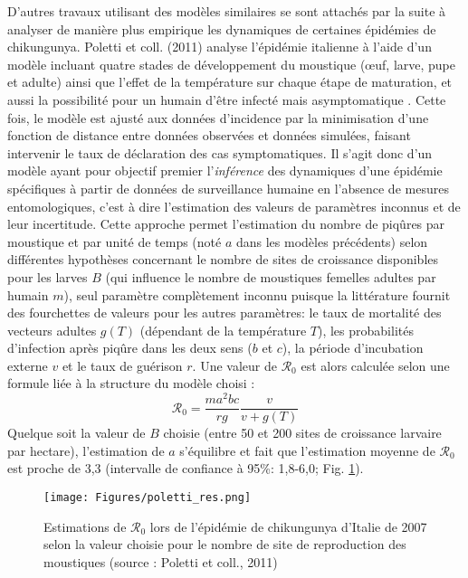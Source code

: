 D'autres travaux utilisant des modèles similaires se sont attachés par la suite à analyser de manière plus empirique les dynamiques de certaines épidémies de chikungunya.
Poletti et coll. (2011) analyse l'épidémie italienne à l'aide d'un modèle incluant quatre stades de développement du moustique (\oe uf, larve, pupe et adulte) ainsi que l'effet de la température sur chaque étape de maturation, et aussi la possibilité pour un humain d'être infecté mais asymptomatique \cite{poletti2011transmission}.
Cette fois, le modèle est ajusté aux données d'incidence par la minimisation d'une fonction de distance entre données observées et données simulées, faisant intervenir le taux de déclaration des cas symptomatiques.
Il s'agit donc d'un modèle ayant pour objectif premier l'{\em inférence} des dynamiques d'une épidémie spécifiques à partir de données de surveillance humaine en l'absence de mesures entomologiques, c'est à dire l'estimation des valeurs de paramètres inconnus et de leur incertitude.
Cette approche permet l'estimation du nombre de piqûres par moustique et par unité de temps (noté $a$ dans les modèles précédents) selon différentes hypothèses concernant le nombre de sites de croissance disponibles pour les larves $B$ (qui influence le nombre de moustiques femelles adultes par humain $m$), seul paramètre complètement inconnu puisque la littérature fournit des fourchettes de valeurs pour les autres paramètres:  le taux de mortalité des vecteurs adultes $g(T)$ (dépendant de la température $T$), les probabilités d'infection après piqûre dans les deux sens ($b$ et $c$), la période d'incubation externe $v$ et le taux de guérison $r$. 
Une valeur de  $\mathcal{R}_0$ est alors calculée selon une formule liée à la structure du modèle choisi :
\begin{equation}
\label{eq:poletti}
\mathcal{R}_0 = \frac{ma^2bc}{rg} \frac{v}{v+g(T)}
\end{equation}
Quelque soit la valeur de $B$ choisie (entre 50 et 200 sites de croissance larvaire par hectare), l'estimation de $a$ s'équilibre et fait que l'estimation moyenne de $\mathcal{R}_0$ est proche de 3,3 (intervalle de confiance à 95\%: 1,8-6,0; Fig. \ref{fig:poletti}).

\begin{figure}[t]
	\centering
	\texttt{[image: Figures/poletti\_res.png]}
	\caption{Estimations de $\mathcal{R}_0$ lors de l'épidémie de chikungunya d'Italie de 2007 selon la valeur choisie pour le nombre de site de reproduction des moustiques (source : Poletti et coll., 2011)}
	\label{fig:poletti}
\end{figure}


